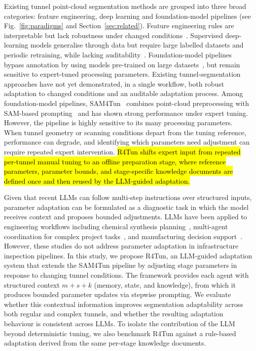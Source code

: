 \documentclass[a4paper,fleqn]{cas-dc}
\begin{document}
{%
Existing tunnel point-cloud segmentation methods are grouped into three broad categories: feature engineering, deep learning and foundation-model pipelines
(see Fig.~\ref{fig:paradigms} and Section~\ref{sec:related}). Feature engineering rules are interpretable but lack robustness under changed conditions~\citep{weidner2024generalized}. Supervised deep-learning models generalise through data but require large labelled datasets and periodic retraining, while lacking auditability~\citep{duan2023high, cha2024deep, su2024review}. Foundation-model pipelines bypass annotation by using models pre-trained on large datasets~\citep{bommasani2021foundation, kirillov2023sam}, but remain sensitive to expert-tuned processing parameters. Existing tunnel-segmentation approaches have not yet demonstrated, in a single workflow, both robust adaptation to changed conditions and an auditable adaptation process. Among foundation-model pipelines, SAM4Tun~\citep{ye2025sam4tun} combines point-cloud preprocessing with SAM-based prompting~\citep{kirillov2023sam} and has shown strong performance under expert tuning. However, the pipeline is highly sensitive to its many processing parameters. When tunnel geometry or scanning conditions depart from the tuning reference, performance can degrade, and identifying which parameters need adjustment can require repeated expert intervention. \hl{R4Tun shifts expert input from repeated per-tunnel manual tuning to an offline preparation stage, where reference parameters, parameter bounds, and stage-specific knowledge documents are defined once and then reused by the LLM-guided adaptation.}

Given that recent LLMs can follow multi-step instructions over structured inputs, parameter adaptation can be formulated as a diagnostic task in which the model receives context and proposes bounded adjustments. LLMs have been applied to engineering workflows including chemical synthesis planning~\citep{bran2024chemcrow}, multi-agent coordination for complex project tasks~\citep{qian2024chatdev, hong2024metagpt, chen2024comm}, and manufacturing decision support~\citep{garcia2024manufacturing}. However, these studies do not address parameter adaptation in infrastructure inspection pipelines. In this study, we propose R4Tun, an LLM-guided adaptation system that extends the SAM4Tun pipeline by adjusting stage parameters in response to changing tunnel conditions. The framework provides each agent with structured context $m+s+k$ (memory, state, and knowledge), from which it produces bounded parameter updates via stepwise prompting. We evaluate whether this contextual information improves segmentation adaptability across both regular and complex tunnels, and whether the resulting adaptation behaviour is consistent across LLMs. To isolate the contribution of the LLM beyond deterministic tuning, we also benchmark R4Tun against a rule-based adaptation derived from the same per-stage knowledge documents.

}
\end{document}
